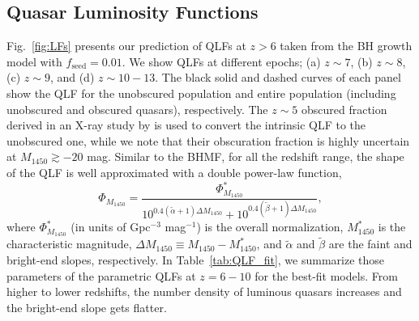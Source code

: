 \documentclass[twocolumn, twocolappendix]{aastex63}
\newcommand{\fseed}{f_\mathrm{seed}}
\newcommand{\Muv}{M_{1450}}
\begin{document}
\begin{CJK*}{UTF8}{gbsn}
\subsection{Quasar Luminosity Functions}
\label{sec:qlfglf}


Fig.~\ref{fig:LFs} presents our prediction of QLFs at $z>6$ taken from the BH growth model with $\fseed=0.01$.
We show QLFs at different epochs; (a) $z\sim 7$, (b) $z\sim 8$, (c) $z\sim 9$, and (d) $z\sim 10-13$.
The black solid and dashed curves of each panel show the QLF for the unobscured population 
and entire population (including unobscured and obscured quasars), respectively.
The $z\sim 5$ obscured fraction derived in an X-ray study by \citet{2014ApJ...786..104U} is used to convert the intrinsic QLF to the unobscured one,
while we note that their obscuration fraction is highly uncertain at $\Muv \gtrsim-20$ mag.
Similar to the BHMF, for all the redshift range, the shape of the QLF is well approximated with a double power-law function,
%
\begin{equation}
\Phi_{\Muv} = \frac{\Phi_{\Muv}^\ast}
{10^{0.4(\tilde \alpha+1)\Delta \Muv} + 10^{0.4(\tilde \beta+1)\Delta \Muv}},
\end{equation}
%
where $\Phi_{\Muv}^\ast$ (in units of Gpc$^{-3}$ mag$^{-1}$) is the overall normalization, $\Muv^\ast$ is the characteristic magnitude,
$\Delta \Muv \equiv \Muv - \Muv^\ast$, and $\tilde \alpha$ and $\tilde \beta$ are the faint and bright-end slopes, respectively.
In Table~\ref{tab:QLF_fit}, we summarize those parameters of the parametric QLFs at $z=6-10$ for the best-fit models.
From higher to lower redshifts, the number density of luminous quasars increases and the bright-end slope gets flatter.



\end{CJK*}
\end{document}

